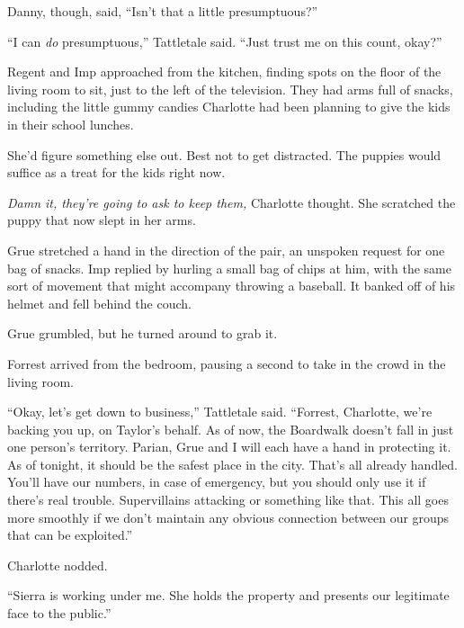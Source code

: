 Danny, though, said, ``Isn't that a little presumptuous?''



``I can \emph{do} presumptuous,'' Tattletale said.  ``Just trust me on this count, okay?''



Regent and Imp approached from the kitchen, finding spots on the floor of the living room to sit, just to the left of the television.  They had arms full of snacks, including the little gummy candies Charlotte had been planning to give the kids in their school lunches.



She'd figure something else out.  Best not to get distracted.  The puppies would suffice as a treat for the kids right now.



\emph{Damn it, they're going to ask to keep them,} Charlotte thought.  She scratched the puppy that now slept in her arms.



Grue stretched a hand in the direction of the pair, an unspoken request for one bag of snacks.  Imp replied by hurling a small bag of chips at him, with the same sort of movement that might accompany throwing a baseball.  It banked off of his helmet and fell behind the couch.



Grue grumbled, but he turned around to grab it.



Forrest arrived from the bedroom, pausing a second to take in the crowd in the living room.



``Okay, let's get down to business,'' Tattletale said.  ``Forrest, Charlotte, we're backing you up, on Taylor's behalf.  As of now, the Boardwalk doesn't fall in just one person's territory.  Parian, Grue and I will each have a hand in protecting it.  As of tonight, it should be the safest place in the city.  That's all already handled.  You'll have our numbers, in case of emergency, but you should only use it if there's real trouble.  Supervillains attacking or something like that.  This all goes more smoothly if we don't maintain any obvious connection between our groups that can be exploited.''



Charlotte nodded.



``Sierra is working under me.  She holds the property and presents our legitimate face to the public.''



